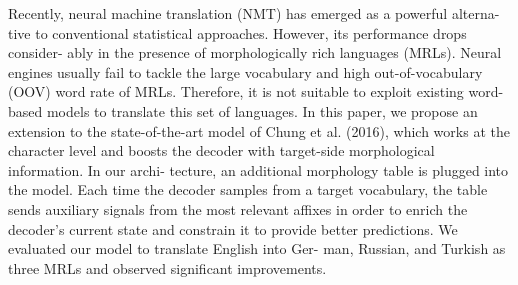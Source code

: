 Recently, neural machine translation (NMT) has emerged as a powerful alterna- tive to conventional statistical approaches. However, its performance drops consider- ably in the presence of morphologically rich languages (MRLs). Neural engines usually fail to tackle the large vocabulary and high out-of-vocabulary (OOV) word rate of MRLs. Therefore, it is not suitable to exploit existing word-based models to translate this set of languages. In this paper, we propose an extension to the state-of-the-art model of Chung et al. (2016), which works at the character level and boosts the decoder with target-side morphological information. In our archi- tecture, an additional morphology table is plugged into the model. Each time the decoder samples from a target vocabulary, the table sends auxiliary signals from the most relevant affixes in order to enrich the decoder's current state and constrain it to provide better predictions. We evaluated our model to translate English into Ger- man, Russian, and Turkish as three MRLs and observed significant improvements.
